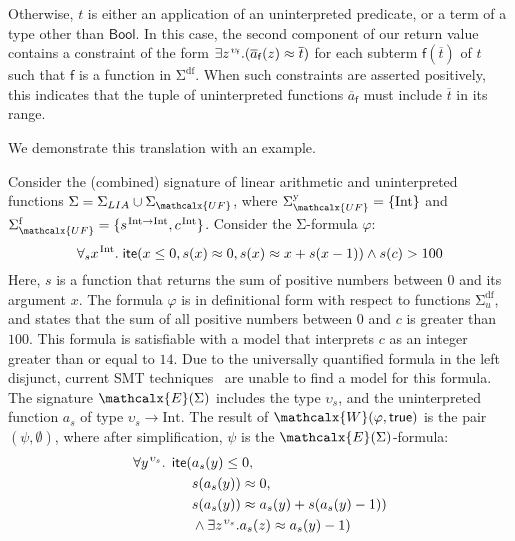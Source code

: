 \documentclass[runningheads,a4paper]{llncs}
\newcommand{\con}[1]{\mathsf{#1}}
\renewcommand\vec[1]{\overline{#1}}
\let\oldSigma=\Sigma
\def\Sigma{\mathrm{\oldSigma}}
\newcommand{\teq}{\approx}
\newcommand{\conv}{\mathcalx{W}}
\newcommand{\ssorts}[1]{#1^\mathrm{y}}
\newcommand{\sfuns}[1]{#1^\mathrm{f}}
\newcommand{\sfundefs}[1]{#1^\mathrm{df}}
\newcommand{\sortint}{\mathrm{Int}}
\newcommand{\ptrue}{\con{true}}
\newcommand{\Bool}{\con{Bool}}
\newcommand{\lite}{\con{ite}}
\newcommand{\farg}[1]{a_{#1}}
\newcommand{\vecfarg}[1]{\vec{a}_{#1}}
\newcommand{\fargsort}[1]{\upsilon_{#1}}
\newcommand{\Sigmalia}{\Sigma_{LIA}}
\newcommand{\extendsig}[1]{\mathcalx{E}( #1 )}
\newcommand{\vthinspace}{\kern+0.083333em}
\newcommand{\typ}[1]{^{\vthinspace #1}}
\newcommand{\euf}{\ensuremath{\mathcalx{UF}}\xspace}
\begin{document}
Otherwise, $t$ is either an application of an uninterpreted predicate, or a term of a type other than $\Bool$.
In this case, the second component of our return value contains a constraint of the form $\exists z\typ{\fargsort{\con{f}}}. ( \vecfarg{\con{f}}( z ) \teq \vec t )$
for each subterm $\con{f}( \vec t )$ of $t$ such that $\con{f}$ is a function in $\sfundefs{\Sigma}$.
When such constraints are asserted positively, this indicates that the tuple of uninterpreted functions $\vecfarg{\con{f}}$ must include $\vec t$ in its range.

We demonstrate this translation with an example.

\begin{example}
\label{ex:translation}
Consider the (combined) signature of linear arithmetic and uninterpreted functions $\Sigma = \Sigmalia \cup \Sigma_{\euf}$,
where $\ssorts{\Sigma_{\euf}} = \{ \sortint \}$ and 
$\sfuns{\Sigma_{\euf}} = \{ s\typ{ \sortint \rightarrow \sortint }, c\typ{ \sortint } \}$.
Consider the $\Sigma$-formula $\varphi$:
\begin{equation} \label{eq:ex-before}
\forall_{s} x\typ{\sortint}.\; \lite( x \leq 0, s(x) \teq 0, s( x ) \teq x + s( x-1 ) ) \wedge s( c ) > 100
\end{equation} 
Here, $s$ is a function that returns the sum of positive numbers between $0$ and its argument $x$.
The formula $\varphi$ is in definitional form with respect to functions $\sfundefs{\Sigma_u}$,
and states that the sum of all positive numbers between $0$ and $c$ is greater than $100$.
This formula is satisfiable with a model that interprets $c$ as an integer greater than or equal to $14$.
Due to the universally quantified formula in the left disjunct,
current SMT techniques~\cite{GeDeM-CAV-09, ReyEtAl-1-RR-13} are unable to find a model for this formula.
The signature $\extendsig{\Sigma}$ includes the type $\fargsort{s}$,
and the uninterpreted function $\farg{s}$ of type $\fargsort{s} \rightarrow \sortint$.
The result of $\conv( \varphi, \ptrue )$ is the pair $( \psi, \emptyset )$, where after simplification, $\psi$ is the $\extendsig{\Sigma}$-formula:
\begin{eqnarray} \label{eq:ex-after}
\begin{split}
\forall y\typ{\fargsort{s}}.\;\, \lite( & \farg{s}( y ) \leq 0,  \\
 & s(\farg{s}( y )) \teq 0, \\
 & s(\farg{s}( y )) \teq \farg{s}( y ) + s( \farg{s}( y )-1 ) ) \\
 & \wedge \exists z\typ{\fargsort{s}}. \farg{s}( z ) \teq \farg{s}( y )-1 )

\end{split}
\end{eqnarray}
\end{example}
\end{document}
